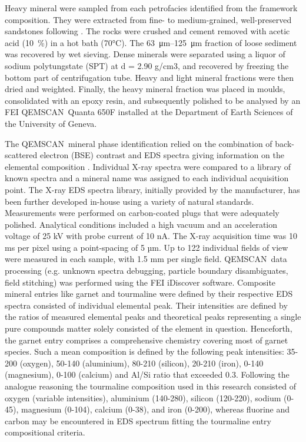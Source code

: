 \documentclass[twoside]{article}
\newcommand\registred{\textsuperscript{\tiny\textregistered}}
\begin{document}
Heavy mineral were sampled from each petrofacies identified from the framework composition. They were extracted from fine- to medium-grained, well-preserved sandstones following \cite{Mange1992}. The rocks were crushed and cement removed with acetic acid (10~\%) in a hot bath (70°C). The \SIrange{63}{125}{\micro\meter} fraction of loose sediment was recovered by wet sieving. Dense minerals were separated using a liquor of sodium polytungstate (SPT) at d = 2.90 g/cm3, and recovered by freezing the bottom part of centrifugation tube. Heavy and light mineral fractions were then dried and weighted. Finally, the heavy mineral fraction was placed in moulds, consolidated with an epoxy resin, and subsequently polished to be analysed by an FEI QEMSCAN\registred\ Quanta 650F installed at the Department of Earth Sciences of the University of Geneva.\par
\medskip
The QEMSCAN\registred\ mineral phase identification relied on the combination of back-scattered electron (BSE) contrast and EDS spectra giving information on the elemental composition \citep{Gottlieb2000}. Individual X-ray spectra were compared to a library of known spectra and a mineral name was assigned to each individual acquisition point. The X-ray EDS spectra library, initially provided by the manufacturer, has been further developed in-house using a variety of natural standards. Measurements were performed on carbon-coated plugs that were adequately polished. Analytical conditions included a high vacuum and an acceleration voltage of 25 kV with probe current of 10 nA. The X-ray acquisition time was 10 ms per pixel using a point-spacing of 5 µm. Up to 122 individual fields of view were measured in each sample, with 1.5 mm per single field. QEMSCAN\registred\ data processing (e.g. unknown spectra debugging, particle boundary disambiguates, field stitching) was performed using the FEI iDiscover software. Composite mineral entries like garnet and tourmaline were defined by their respective EDS spectra consisted of individual elemental peak. Their intensities are defined by the ratios of measured elemental peaks and theoretical peaks representing a single pure compounds matter solely consisted of the element in question. Henceforth, the garnet entry comprises a comprehensive chemistry covering most of garnet species. Such a mean composition is defined by the following peak intensities: 35-200 (oxygen), 50-140 (aluminium), 80-210 (silicon), 20-210 (iron), 0-140 (magnesium), 0-100 (calcium) and Al/Si ratio that exceeded 0.3. Following the analogue reasoning the tourmaline composition used in this research consisted of oxygen (variable intensities), aluminium (140-280), silicon (120-220), sodium (0-45), magnesium (0-104), calcium (0-38), and iron (0-200), whereas fluorine and carbon may be encountered in EDS spectrum fitting the tourmaline entry compositional criteria.
\end{document}
